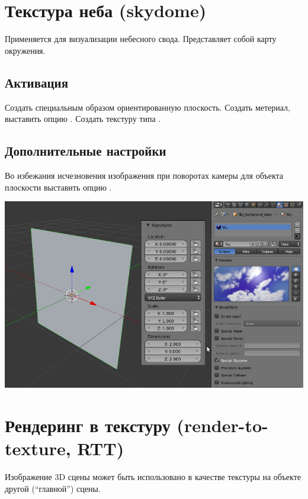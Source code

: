 \documentclass[a4paper,12pt,oneside]{sphinxmanual}
\begin{document}

\section{Текстура неба (skydome)}
\label{textures:skydome}\label{textures:skydome-texture}\label{textures:index-12}
Применяется для визуализации небесного свода. Представляет собой карту окружения.


\subsection{Активация}
\label{textures:id22}
Создать специальным образом ориентированную плоскость. Создать метериал, выставить опцию . Создать текстуру типа .


\subsection{Дополнительные настройки}
\label{textures:id23}
Во избежания исчезновения изображения при поворотах камеры для объекта плоскости выставить опцию .

{\hfill\includegraphics[width=1.000\linewidth]{skydome.jpg}\hfill}

\begin{DUlineblock}{0em}
\item[] 
\end{DUlineblock}
\label{textures:render-to-texture}

\section{Рендеринг в текстуру (render-to-texture, RTT)}
\label{textures:render-to-texture-rtt}\label{textures:index-13}
Изображение 3D сцены может быть использовано в качестве текстуры на объекте другой (``главной'') сцены.
\end{document}
